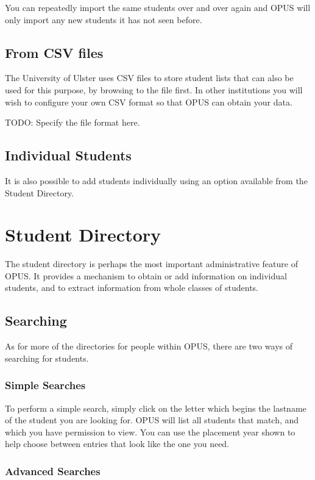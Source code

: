 \documentclass[12 pt]{book}
\begin{document}
You can repeatedly import the same students over and over again and OPUS will only import
any new students it has not seen before.

\section{From CSV files}

The University of Ulster uses CSV files to store student lists that can also be used for this
purpose, by browsing to the file first. In other institutions you will wish to configure your
own CSV format so that OPUS can obtain your data.

TODO: Specify the file format here.

\section{Individual Students}

It is also possible to add students individually using an option available from the Student
Directory.

\chapter{Student Directory}

The student directory is perhaps the most important administrative feature of OPUS. It provides
a mechanism to obtain or add information on individual students, and to extract information from
whole classes of students.

\section{Searching}

As for more of the directories for people within OPUS, there are two ways of
searching for students.

\subsection{Simple Searches}

To perform a simple search, simply click on the letter which begins the lastname
of the student you are looking for. OPUS will list all students that match, and
which you have permission to view. You can use the placement year shown to help
choose between entries that look like the one you need.

\subsection{Advanced Searches}
\end{document}
